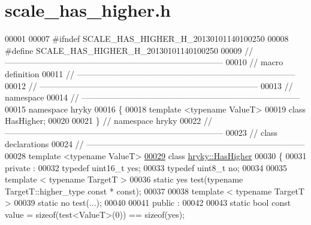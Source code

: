 \hypertarget{scale__has__higher_8h_source}{\section{scale\-\_\-has\-\_\-higher.\-h}
}

\begin{DoxyCode}
00001 
00007 \textcolor{preprocessor}{#ifndef SCALE\_HAS\_HIGHER\_H\_20130101140100250}
00008 \textcolor{preprocessor}{}\textcolor{preprocessor}{#define SCALE\_HAS\_HIGHER\_H\_20130101140100250}
00009 \textcolor{preprocessor}{}\textcolor{comment}{//
      ------------------------------------------------------------------------------}
00010 \textcolor{comment}{// macro definition}
00011 \textcolor{comment}{//
      ------------------------------------------------------------------------------}
00012 \textcolor{comment}{//
      ------------------------------------------------------------------------------}
00013 \textcolor{comment}{// namespace}
00014 \textcolor{comment}{//
      ------------------------------------------------------------------------------}
00015 \textcolor{keyword}{namespace }hryky
00016 \{
00018     \textcolor{keyword}{template} <\textcolor{keyword}{typename} ValueT>
00019     \textcolor{keyword}{class }HasHigher;
00020 
00021 \} \textcolor{comment}{// namespace hryky}
00022 \textcolor{comment}{//
      ------------------------------------------------------------------------------}
00023 \textcolor{comment}{// class declarations}
00024 \textcolor{comment}{//
      ------------------------------------------------------------------------------}
00028 \textcolor{comment}{}\textcolor{keyword}{template} <\textcolor{keyword}{typename} ValueT>
\hypertarget{scale__has__higher_8h_source_l00029}{}\hyperlink{classhryky_1_1_has_higher}{00029} \textcolor{keyword}{class }\hyperlink{classhryky_1_1_has_higher}{hryky::HasHigher}
00030 \{
00031 \textcolor{keyword}{private} :
00032     \textcolor{keyword}{typedef} uint16\_t    yes;
00033     \textcolor{keyword}{typedef} uint8\_t     no;
00034 
00035     \textcolor{keyword}{template} < \textcolor{keyword}{typename} TargetT >
00036     \textcolor{keyword}{static} yes test(\textcolor{keyword}{typename} TargetT::higher\_type \textcolor{keyword}{const} * \textcolor{keyword}{const});
00037     
00038     \textcolor{keyword}{template} < \textcolor{keyword}{typename} TargetT >
00039     \textcolor{keyword}{static} no test(...);
00040     
00041 \textcolor{keyword}{public} :
00042 
00043     \textcolor{keyword}{static} \textcolor{keywordtype}{bool} \textcolor{keyword}{const} value = \textcolor{keyword}{sizeof}(test<ValueT>(0)) == \textcolor{keyword}{sizeof}(yes);

\end{DoxyCode}
